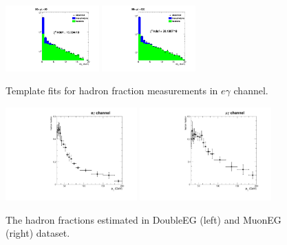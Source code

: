 \documentclass[thesis.tex]{subfiles}
\renewcommand\_{\textunderscore\allowbreak}
\begin{document}
\begin{figure}
   \includegraphics[width=0.32\textwidth]{Figures/frac-80-90_ChIso-DoubleEG-ReMiniAOD.pdf}   \includegraphics[width=0.32\textwidth]{Figures/frac-90-120_ChIso-DoubleEG-ReMiniAOD.pdf}   \\
  \caption{Template fits for hadron fraction measurements in $e\gamma$ channel.}
 \label{fig:DoubleEGjetfakebins}
\end{figure}

\begin{figure}
  \centering
    \includegraphics[width=0.45\textwidth]{Figures/JetFakePho_DoubleEG_ReMiniAOD.pdf}
    \includegraphics[width=0.45\textwidth]{Figures/JetFakePho_MuonEG_ReMiniAOD.pdf}
  \caption{The hadron fractions estimated in DoubleEG (left) and MuonEG (right) dataset.} 
    \label{fig:hadronfraction}
\end{figure}
\end{document}
